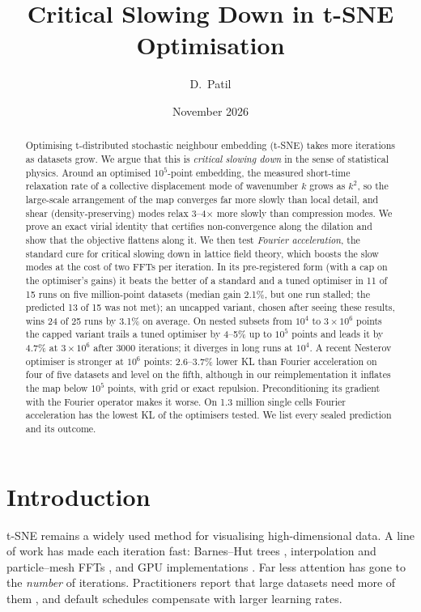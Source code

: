 \documentclass[11pt]{article}
\title{Critical Slowing Down in t-SNE Optimisation}
\author{D.~Patil}
\date{November 2026}
\begin{document}
\maketitle

\begin{abstract}
Optimising t-distributed stochastic neighbour embedding (t-SNE) takes more iterations as datasets grow. We
argue that this is \emph{critical slowing down} in the sense of statistical physics. Around an optimised
$10^5$-point embedding, the measured short-time relaxation rate of a collective displacement mode of wavenumber
$k$ grows as $k^2$, so the large-scale arrangement of the map converges far more slowly than local detail, and
shear (density-preserving) modes relax 3--4$\times$ more slowly than compression modes. We prove an exact virial
identity that certifies non-convergence along the dilation and show that the objective flattens along it. We
then test \emph{Fourier acceleration}, the standard cure for critical slowing down in lattice field theory, which
boosts the slow modes at the cost of two FFTs per iteration. In its pre-registered form (with a cap on the
optimiser's gains) it beats the better of a standard and a tuned optimiser in 11 of 15 runs on five million-point
datasets (median gain 2.1\%, but one run stalled; the predicted 13 of 15 was not met); an uncapped variant, chosen
after seeing these results, wins 24 of 25 runs by 3.1\% on average. On nested subsets from $10^4$ to $3\times10^6$
points the capped variant trails a tuned optimiser by 4--5\% up to $10^5$ points and leads it by 4.7\% at
$3\times10^6$ after 3000 iterations; it diverges in long runs at $10^4$. A recent Nesterov optimiser
\citep{lambert2023nesterov} is stronger at $10^6$ points: 2.6--3.7\% lower KL than Fourier acceleration on four of
five datasets and level on the fifth, although in our reimplementation it inflates the map below $10^5$ points, with
grid or exact repulsion. Preconditioning its gradient with the Fourier operator
makes it worse. On 1.3 million single cells Fourier acceleration has the lowest KL of the optimisers tested. We list
every sealed prediction and its outcome.
\end{abstract}

\section{Introduction}
t-SNE \citep{vandermaaten2008} remains a widely used method for visualising high-dimensional data.
A line of work has made each iteration fast: Barnes--Hut trees \citep{vandermaaten2014bh}, interpolation and
particle--mesh FFTs \citep{linderman2019fitsne,delchevalerie2021pm,pezzotti2020gpgpu}, and GPU
implementations \citep{chan2019tsnecuda,cuml}. Far less attention has gone to the \emph{number} of
iterations. Practitioners report that large datasets need more of them \citep{belkina2019,kobak2019art}, and
default schedules compensate with larger learning rates.
\end{document}
